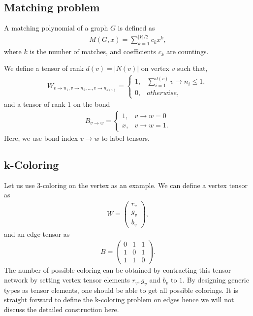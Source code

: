 \documentclass[review,onefignum,onetabnum]{siamart190516}
\newcommand{\<}{\langle}
\renewcommand{\>}{\rangle}
\newcounter{example}
\begin{document}
\subsection{Matching problem}
A matching polynomial of a graph $G$ is defined as
\begin{align}
    M(G, x) = \sum\limits_{k=1}^{|V|/2} c_k x^k,
\end{align}
where $k$ is the number of matches, and coefficients $c_k$ are countings.

We define a tensor of rank $d(v) = |N(v)|$ on vertex $v$ such that,
\begin{align}
    W_{v\rightarrow n_1, v\rightarrow n_2, \ldots, v\rightarrow n_{d(v)}} = \begin{cases}
        1, & \sum_{i=1}^{d(v)} v\rightarrow n_i \leq 1,\\
        0, & otherwise,
    \end{cases}
\end{align}
and a tensor of rank $1$ on the bond
\begin{align}
    B_{v\rightarrow w} = \begin{cases}
    1, & v \rightarrow w = 0 \\
    x, & v \rightarrow w = 1.
\end{cases}
\end{align}
Here, we use bond index $v \rightarrow w$ to label tensors.

\subsection{k-Coloring}
Let us use 3-coloring on the vertex as an example. We can define a vertex tensor as
\begin{align}
    W = \left(\begin{matrix}
        r_v\\
        g_v\\
        b_v
    \end{matrix}\right),
\end{align}
and an edge tensor as
\begin{align}
    B = \left(\begin{matrix}
        0 & 1 & 1\\
        1 & 0 & 1\\
        1 & 1 & 0
    \end{matrix}\right).
\end{align}
The number of possible coloring can be obtained by contracting this tensor network by setting vertex tensor elements $r_v, g_v$ and $b_v$ to $1$.
By designing generic types as tensor elements, one should be able to get all possible colorings.
It is straight forward to define the k-coloring problem on edges hence we will not discuss the detailed construction here.
\end{document}

